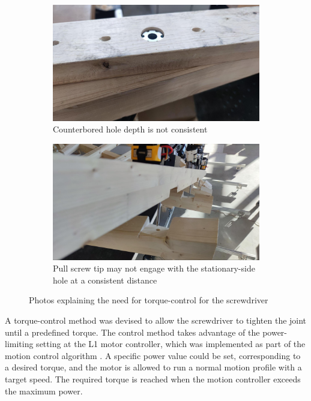 \begin{figure}[!h]
    \centering
    \begin{subfigure}[b]{0.49\textwidth}
        \centering
        \includegraphics[width=\textwidth]{images/7a/img70.jpg}
        \caption{Counterbored hole depth is not consistent}
        \label{fig:counterbored-hole-depth-is-not-consistent}
    \end{subfigure}
    \hfill
    \begin{subfigure}[b]{0.49\textwidth}
        \centering
        \includegraphics[width=\textwidth]{images/7a/img71.jpg}
        \caption{Pull screw tip may not engage with the stationary-side hole at a consistent distance}
        \label{fig:pullscrew-not-enter-hole-at-consistent-distance}
    \end{subfigure}
    \caption{Photos explaining the need for torque-control for the screwdriver}
    \label{fig:torque-control-for-the-screwdriver}
\end{figure}


A torque-control method was devised to allow the screwdriver to tighten the joint until a predefined torque. The control method takes advantage of the power-limiting setting at the L1 motor controller, which was implemented as part of the motion control algorithm . A specific power value could be set, corresponding to a desired torque, and the motor is allowed to run a normal motion profile with a target speed. The required torque is reached when the motion controller exceeds the maximum power. 

